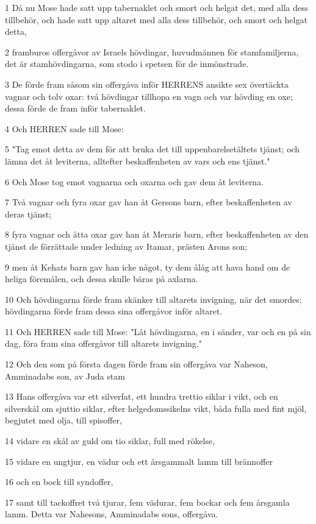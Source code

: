 \par 1 Då nu Mose hade satt upp tabernaklet och smort och helgat det, med alla dess tillbehör, och hade satt upp altaret med alla dess tillbehör, och smort och helgat detta,
\par 2 framburos offergåvor av Israels hövdingar, huvudmännen för stamfamiljerna, det är stamhövdingarna, som stodo i spetsen för de inmönstrade.
\par 3 De förde fram såsom sin offergåva inför HERRENS ansikte sex övertäckta vagnar och tolv oxar: två hövdingar tillhopa en vagn och var hövding en oxe; dessa förde de fram inför tabernaklet.
\par 4 Och HERREN sade till Mose:
\par 5 "Tag emot detta av dem för att bruka det till uppenbarelsetältets tjänst; och lämna det åt leviterna, alltefter beskaffenheten av vars och ens tjänst."
\par 6 Och Mose tog emot vagnarna och oxarna och gav dem åt leviterna.
\par 7 Två vagnar och fyra oxar gav han åt Gersons barn, efter beskaffenheten av deras tjänst;
\par 8 fyra vagnar och åtta oxar gav han åt Meraris barn, efter beskaffenheten av den tjänst de förrättade under ledning av Itamar, prästen Arons son;
\par 9 men åt Kehats barn gav han icke något, ty dem ålåg att hava hand om de heliga föremålen, och dessa skulle bäras på axlarna.
\par 10 Och hövdingarna förde fram skänker till altarets invigning, när det smordes; hövdingarna förde fram dessa sina offergåvor inför altaret.
\par 11 Och HERREN sade till Mose: "Låt hövdingarna, en i sänder, var och en på sin dag, föra fram sina offergåvor till altarets invigning."
\par 12 Och den som på första dagen förde fram sin offergåva var Naheson, Amminadabs son, av Juda stam
\par 13 Hans offergåva var ett silverfat, ett hundra trettio siklar i vikt, och en silverskål om sjuttio siklar, efter helgedomssikelns vikt, båda fulla med fint mjöl, begjutet med olja, till spisoffer,
\par 14 vidare en skål av guld om tio siklar, full med rökelse,
\par 15 vidare en ungtjur, en vädur och ett årsgammalt lamm till brännoffer
\par 16 och en bock till syndoffer,
\par 17 samt till tackoffret två tjurar, fem vädurar, fem bockar och fem årsgamla lamm. Detta var Nahesons, Amminadabs sons, offergåva.
